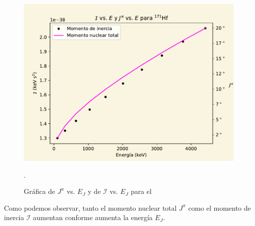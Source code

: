 \documentclass[./../main.tex]{subfiles}
\begin{document}
\begin{exercise}
\begin{solution}
			\begin{figure}[!htb]
				\centering
				\includegraphics[scale=0.85]{moment_of_inertia.pdf}
				\caption{Gráfica de \(J^{\pi}\) vs. \(E_{J}\) y de \(\mathcal{I}\) vs. \(E_{J}\) para el }.
				\label{fig:Jpi-IVSEnergy}
			\end{figure}

			Como podemos observar, tanto el momento nuclear total \(J^{\pi}\) como el momento de inercia \(\mathcal{I}\) aumentan conforme aumenta la energía \(E_{J}\).
		\end{solution}
	\end{exercise}
\end{document}

